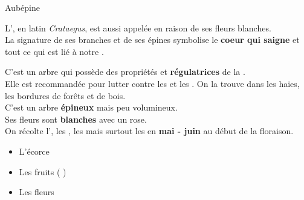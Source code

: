 \ficheidentiteplante
{Aubépine}
{%
    L', en latin \textit{Crataegus}, est aussi appelée  en raison de ses fleurs blanches.\\
    La signature de ses branches et de ses épines symbolise le \textbf{coeur qui saigne} et tout ce qui est lié à notre .

}
{%
    C'est un arbre qui possède des propriétés  et \textbf{régulatrices} de la .\\

    Elle est recommandée pour lutter contre les  et les .
}
{%
    On la trouve dans les haies, les bordures de forêts et de bois.\\
    C'est un arbre \textbf{épineux} mais peu volumineux. \\
    Ses fleurs sont \textbf{blanches} avec un  rose.\\

    On récolte l', les , les  mais surtout les  en \textbf{mai - juin} au début de la floraison.
}
{%
    
    \begin{itemize}[label = \bcplume]
        \item L'écorce
        \item Les fruits (  )
        \item Les fleurs
    \end{itemize}
}
